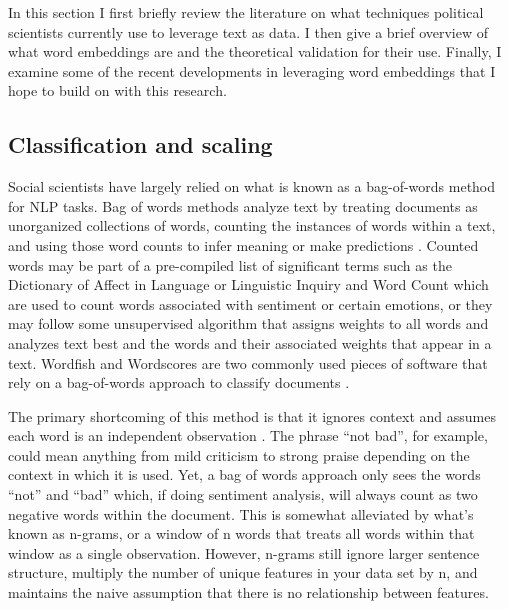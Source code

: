 \documentclass[../embeddings.tex]{subfiles}
\begin{document}
In this section I first briefly review the literature on what techniques political scientists currently use to leverage text as data. I then give a brief overview of what word embeddings are and the theoretical validation for their use. Finally, I examine some of the recent developments in leveraging word embeddings that I hope to build on with this research.

\subsection{Classification and scaling}
Social scientists have largely relied on what is known as a bag-of-words method for NLP tasks. Bag of words methods analyze text by treating documents as unorganized collections of words, counting the instances of words within a text, and using those word counts to infer meaning or make predictions \cite{monroe2008introduction}. Counted words may be part of a pre-compiled list of significant terms such as the Dictionary of Affect in Language \cite{whissell2009using} or Linguistic Inquiry and Word Count \cite{pennebaker2001linguistic} which are used to count words associated with sentiment or  certain emotions, or they may follow some unsupervised algorithm that assigns weights to all words and analyzes text best and the words and their associated weights that appear in a text. Wordfish and Wordscores are two commonly used pieces of software that rely on a bag-of-words approach to classify documents \cite{proksch2008wordfish, laver2003extracting}.

The primary shortcoming of this method is that it ignores context and assumes each word is an independent observation \cite{bruinsma2017validating, monroe2008introduction}. The phrase “not bad”, for example, could mean anything from mild criticism to strong praise depending on the context in which it is used. Yet, a bag of words approach only sees the words “not” and “bad” which, if doing sentiment analysis, will always count as two negative words within the document. This is somewhat alleviated by what’s known as n-grams, or a window of n words that treats all words within that window as a single observation. However, n-grams still ignore larger sentence structure, multiply the number of unique features in your data set by n, and maintains the naive assumption that there is no relationship between features. 
\end{document}
